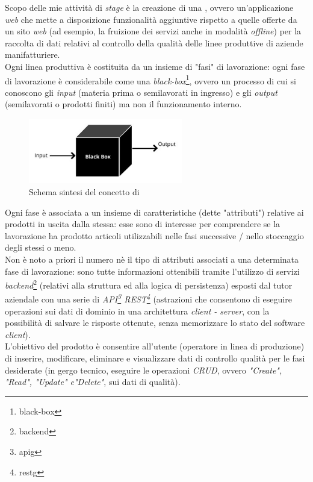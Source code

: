 Scopo delle mie attività di \textit{stage} è la creazione di una , ovvero un'applicazione \textit{web} che mette a disposizione funzionalità aggiuntive rispetto a quelle offerte da un sito \textit{web} (ad esempio, la fruizione dei servizi anche in modalità \textit{offline}) per la raccolta di dati relativi al controllo della qualità delle linee produttive di aziende manifatturiere. \\
Ogni linea produttiva è costituita da un insieme di "fasi" di lavorazione: ogni fase di lavorazione è considerabile come una \textit{black-box}\footnote{\gls{black-box}}, ovvero un processo di cui si conoscono gli \textit{input} (materia prima o semilavorati in ingresso)
e gli \textit{output} (semilavorati o prodotti finiti) ma non il funzionamento interno.
\begin{figure}[H]
    \centering
    \includegraphics[width=0.6\textwidth]{images/black-box.png}
    \caption[Schema sintesi del concetto di \textit{black-box}]{Schema sintesi del concetto di  \footnotemark}
\end{figure}
Ogni fase è associata a un insieme di caratteristiche (dette "attributi") relative ai prodotti in uscita dalla stessa: esse sono di interesse per comprendere se la lavorazione ha prodotto articoli utilizzabili nelle fasi successive / nello stoccaggio degli stessi o meno. \\
Non è noto a priori il numero nè il tipo di attributi associati a una determinata fase di lavorazione: sono tutte informazioni ottenibili tramite l'utilizzo di servizi \textit{backend}\footnote{\gls{backend}} (relativi alla struttura ed alla logica di persistenza) esposti dal tutor aziendale con una
serie di \textit{API\footnote{\gls{apig}} REST\footnote{\gls{restg}}} (astrazioni che consentono di eseguire operazioni sui dati di dominio in una architettura \textit{client - server}, con la possibilità di salvare le risposte ottenute, senza memorizzare lo stato del software \textit{client}). \\
L'obiettivo del prodotto è consentire all'utente (operatore in linea di produzione) di inserire, modificare, eliminare e visualizzare dati di controllo qualità per le fasi desiderate (in gergo tecnico, eseguire le operazioni \textit{CRUD}, ovvero \textit{"Create", "Read", "Update" e"Delete"}, sui dati di qualità).

